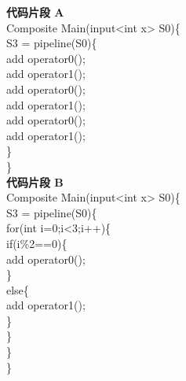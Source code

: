 \begin{algorithm}
  \caption{代码片段 A 和使用了 for/if 的代码片段 B 等价}
  \label{algo: pipeline}
  {\bf 代码片段 A}\\
  Composite Main(input<int x> S0)\{\\
    \hspace*{1 pc} S3 = pipeline(S0)\{\\
    \hspace*{2 pc} add operator0();\\
    \hspace*{2 pc} add operator1();\\
    \hspace*{2 pc} add operator0();\\
    \hspace*{2 pc} add operator1();\\
    \hspace*{2 pc} add operator0();\\
    \hspace*{2 pc} add operator1();\\
    \hspace*{1 pc} \}\\
  \}\\
  {\bf 代码片段 B}\\
  Composite Main(input<int x> S0)\{\\
    \hspace*{1 pc} S3 = pipeline(S0)\{\\
    \hspace*{2 pc} for(int i=0;i<3;i++)\{\\
    \hspace*{3 pc} if(i\%2==0)\{\\
    \hspace*{4 pc} add operator0();\\
    \hspace*{3 pc} \}\\
    \hspace*{3 pc} else\{\\
    \hspace*{4 pc} add operator1();\\
    \hspace*{3 pc} \}\\
    \hspace*{2 pc} \}\\
    \hspace*{1 pc} \}\\
  \}
\end{algorithm}

